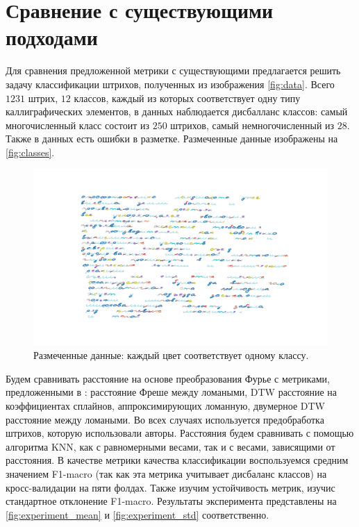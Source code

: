 \documentclass{article}
\begin{document}
\section{Сравнение с существующими подходами}
Для сравнения предложенной метрики с существующими предлагается решить задачу классификации штрихов, полученных из изображения \autoref{fig:data}. Всего $1231$ штрих, $12$ классов, каждый из которых соответствует одну типу каллиграфических элементов, в данных наблюдается дисбалланс классов: самый многочисленный класс состоит из $250$ штрихов, самый немногочисленный из $28$. Также в данных есть ошибки в разметке. Размеченные данные изображены на \autoref{fig:classes}.
\begin{figure}[H]
\centering
    \includegraphics[width=0.8\linewidth, trim={2cm 2cm 2cm 2cm}, clip]{img/classes.pdf}
    \caption{Размеченные данные: каждый цвет соответствует одному классу.}
    \label{fig:classes}
\end{figure}
Будем сравнивать расстояние на основе преобразования Фурье с метриками, предложенными в \citep{pronina2023frechet, pazazia2023dtw}: расстояние Фреше между ломаными, DTW расстояние на коэффициентах сплайнов, аппроксимирующих ломанную, двумерное DTW расстояние между ломаными. Во всех случаях используется предобработка штрихов, которую использовали авторы. Расстояния будем сравнивать с помощью алгоритма KNN, как с равномерными весами, так и с весами, зависящими от расстояния. В качестве метрики качества классификации воспользуемся средним значением F1-macro (так как эта метрика учитывает дисбаланс классов) на кросс-валидации на пяти фолдах. Также изучим устойчивость метрик, изучис стандартное отклонение F1-macro. Результаты эксперимента представлены на \autoref{fig:experiment_mean} и \autoref{fig:experiment_std} соответственно. 
\end{document}
